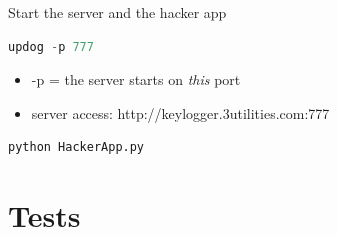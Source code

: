 \documentclass{beamer}
\begin{document}
\begin{frame}[fragile]{Start the server and the hacker app}
\begin{lstlisting}[language=Python]
updog -p 777
\end{lstlisting}
\begin{itemize}
	\item -p = the server starts on \textit{this} port
	\item server access: http://keylogger.3utilities.com:777
\end{itemize}

\begin{lstlisting}[language=Python]
python HackerApp.py
\end{lstlisting}
\end{frame}


\section{Tests}
\end{document}
